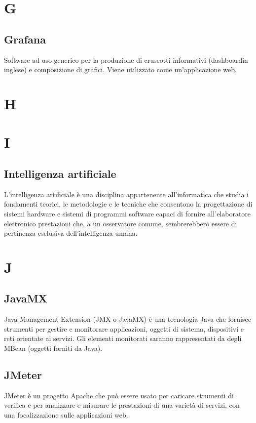 \clearpage
\section*{G}

\subsection*{Grafana}
Software ad uso generico per la produzione di cruscotti informativi (dashboard\glosp in inglese) e composizione di grafici. Viene utilizzato come un'applicazione web.

\clearpage
\section*{H}

\clearpage
\section*{I}
	
\subsection*{Intelligenza artificiale}
L'intelligenza artificiale è una disciplina appartenente all'informatica che studia i fondamenti teorici, le metodologie e le tecniche che consentono la progettazione di sistemi hardware e sistemi di programmi software capaci di fornire all'elaboratore elettronico prestazioni che, a un osservatore comune, sembrerebbero essere di pertinenza esclusiva dell'intelligenza umana.

\clearpage
\section*{J}

\subsection*{JavaMX}
Java Management Extension (JMX o JavaMX) è una tecnologia Java che fornisce strumenti per gestire e monitorare applicazioni, oggetti di sistema, dispositivi e reti orientate ai servizi. Gli elementi monitorati saranno rappresentati da degli MBean (oggetti forniti da Java).

\subsection*{JMeter}
JMeter è un progetto Apache che può essere usato per caricare strumenti di verifica e per analizzare e misurare le prestazioni di una varietà di servizi, con una focalizzazione sulle applicazioni web.

